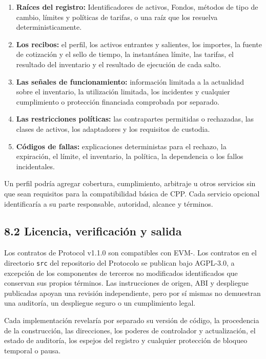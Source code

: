 \documentclass[11pt]{article}
\begin{document}
\begin{enumerate}[leftmargin=*]
\item \textbf{Raíces del registro:} Identificadores de activos, Fondos, métodos de tipo de cambio, límites y políticas de tarifas, o una raíz que los resuelva deterministicamente.
\item \textbf{Los recibos:} el perfil, los activos entrantes y salientes, los importes, la fuente de cotización y el sello de tiempo, la instantánea límite, las tarifas, el resultado del inventario y el resultado de ejecución de cada salto.
\item \textbf{Las señales de funcionamiento:} información limitada a la actualidad sobre el inventario, la utilización limitada, los incidentes y cualquier cumplimiento o protección financiada comprobada por separado.
\item \textbf{Las restricciones políticas:} las contrapartes permitidas o rechazadas, las clases de activos, los adaptadores y los requisitos de custodia.
\item \textbf{Códigos de fallas:} explicaciones deterministas para el rechazo, la expiración, el límite, el inventario, la política, la dependencia o los fallos incidentales.
\end{enumerate}
Un perfil podría agregar cobertura, cumplimiento, arbitraje u otros servicios sin que sean requisitos para la compatibilidad básica de CPP. Cada servicio opcional identificaría a su parte responsable, autoridad, alcance y términos.

\subsection*{8.2 Licencia, verificación y salida}

Los contratos de Protocol v1.1.0 son compatibles con EVM-. Los contratos en el directorio \texttt{src} del repositorio del Protocolo se publican bajo AGPL-3.0, a excepción de los componentes de terceros no modificados identificados que conservan sus propios términos. Las instrucciones de origen, ABI y despliegue publicadas apoyan una revisión independiente, pero por sí mismas no demuestran una auditoría, un despliegue seguro o un cumplimiento legal.

Cada implementación revelaría por separado su versión de código, la procedencia de la construcción, las direcciones, los poderes de controlador y actualización, el estado de auditoría, los espejos del registro y cualquier protección de bloqueo temporal o pausa.
\end{document}
